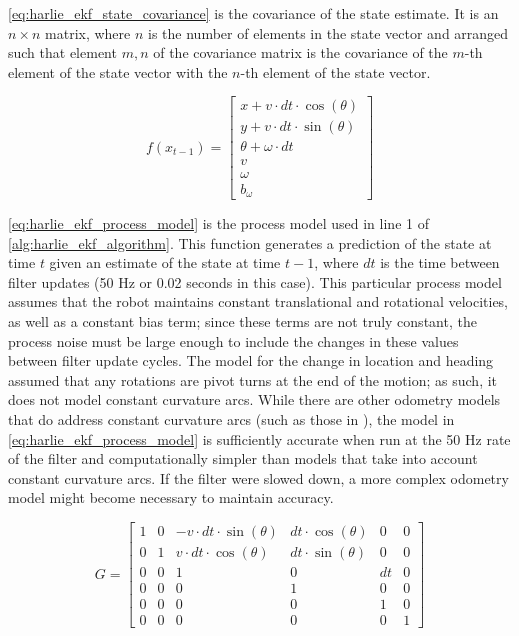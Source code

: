 \eqref{eq:harlie_ekf_state_covariance} is the covariance of the state estimate. It is an $n\times n$ matrix, where $n$ is the number of elements in the state vector and arranged such that element $m,n$ of the covariance matrix is the covariance of the $m$-th element of the state vector with the $n$-th element of the state vector.

\begin{equation}
	f\left(x_{t-1}\right) =
	\begin{bmatrix}
		x + v \cdot dt \cdot \cos\left(\theta\right) \\
		y + v \cdot dt \cdot \sin\left(\theta\right)  \\
		\theta + \omega \cdot dt \\
		v \\
		\omega \\
		b_{\omega}
	\end{bmatrix}
	\label{eq:harlie_ekf_process_model}
\end{equation}

\eqref{eq:harlie_ekf_process_model} is the process model used in line 1 of \autoref{alg:harlie_ekf_algorithm}. This function generates a prediction of the state at time $t$ given an estimate of the state at time $t-1$, where $dt$ is the time between filter updates (50 Hz or 0.02 seconds in this case). This particular process model assumes that the robot maintains constant translational and rotational velocities, as well as a constant bias term; since these terms are not truly constant, the process noise must be large enough to include the changes in these values between filter update cycles. The model for the change in location and heading assumed that any rotations are pivot turns at the end of the motion; as such, it does not model constant curvature arcs. While there are other odometry models that do address constant curvature arcs (such as those in \autocite{ProbRobotics}), the model in \eqref{eq:harlie_ekf_process_model} is sufficiently accurate when run at the 50 Hz rate of the filter and computationally simpler than models that take into account constant curvature arcs. If the filter were slowed down, a more complex odometry model might become necessary to maintain accuracy.

\begin{equation}
	G =
	\begin{bmatrix}
		1 & 0 & -v \cdot dt \cdot \sin\left(\theta\right) & dt \cdot \cos\left(\theta\right) & 0 & 0 \\
		0 & 1 & v \cdot dt \cdot \cos\left(\theta\right) & dt \cdot \sin\left(\theta\right) & 0 & 0 \\
		0 & 0 & 1 & 0 & dt & 0 \\
		0 & 0 & 0 & 1 & 0 & 0 \\
		0 & 0 & 0 & 0 & 1 & 0 \\
		0 & 0 & 0 & 0 & 0 & 1 
	\end{bmatrix}
	\label{eq:harlie_ekf_process_jacobian}
\end{equation}

